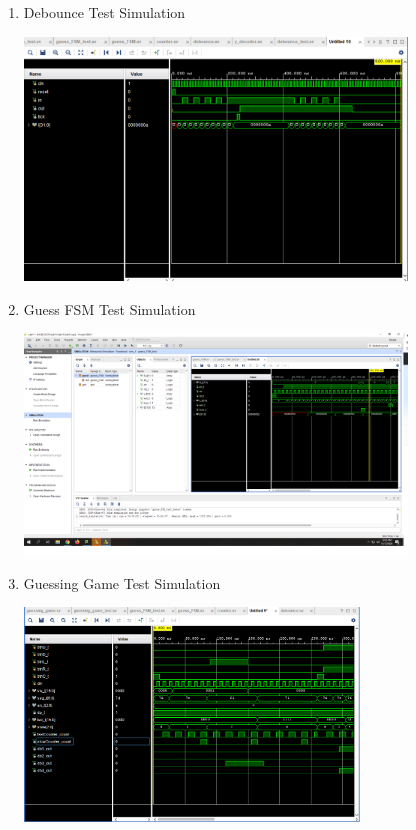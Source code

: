 \documentclass[11pt]{article}
\begin{document}
\bigskip
\begin{enumerate}
	
	\item Debounce Test Simulation
	
	\includegraphics[width=0.8\textwidth]{debounce_sc.PNG}
	
	\item Guess FSM Test Simulation 
	
	\includegraphics[width=0.8\textwidth, trim= 20cm 16cm 0cm 5.5cm, clip]{guess_FSM_sh.PNG}
	
	\item Guessing Game Test Simulation 
	
	\includegraphics[width=0.7\textwidth]{guessing_game_sc.png}

\end{enumerate}
\pagebreak
\end{document}
